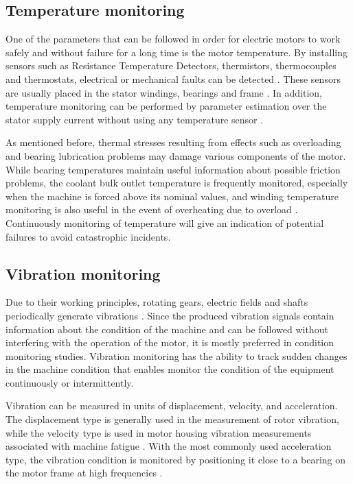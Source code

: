 \subsection{Temperature monitoring}

One of the parameters that can be followed in order for electric motors to work safely and without failure for a long time is the motor temperature. By installing sensors such as Resistance Temperature Detectors, thermistors, thermocouples and thermostats, electrical or mechanical faults can be detected \cite{mistry2016rotating}. These sensors are usually placed in the stator windings, bearings and frame \cite{ieee2017}. In addition, temperature monitoring can be performed by parameter estimation over the stator supply current without using any temperature sensor \cite{kumar2019comprehensive}.

As mentioned before, thermal stresses resulting from effects such as overloading and bearing lubrication problems may damage various components of the motor. While bearing temperatures maintain useful information about possible friction problems, the coolant bulk outlet temperature is frequently monitored, especially when the machine is forced above its nominal values, and winding temperature monitoring is also useful in the event of overheating due to overload \cite{thorsen1998methods}. Continuously monitoring of temperature will give an indication of potential failures to avoid catastrophic incidents.

\subsection{Vibration monitoring}

Due to their working principles, rotating gears, electric fields and shafts periodically generate vibrations \cite{randall2021vibration}. Since the produced vibration signals contain information about the condition of the machine and can be followed without interfering with the operation of the motor, it is mostly preferred in condition monitoring studies. Vibration monitoring has the ability to track sudden changes in the machine condition that enables monitor the condition of the equipment continuously or intermittently.

Vibration can be measured in units of displacement, velocity, and acceleration. The displacement type is generally used in the measurement of rotor vibration, while the velocity type is used in motor housing vibration measurements associated with machine fatigue \cite{mistry2016rotating}. With the most commonly used acceleration type, the vibration condition is monitored by positioning it close to a bearing on the motor frame at high frequencies \cite{mistry2016rotating,iso}.

